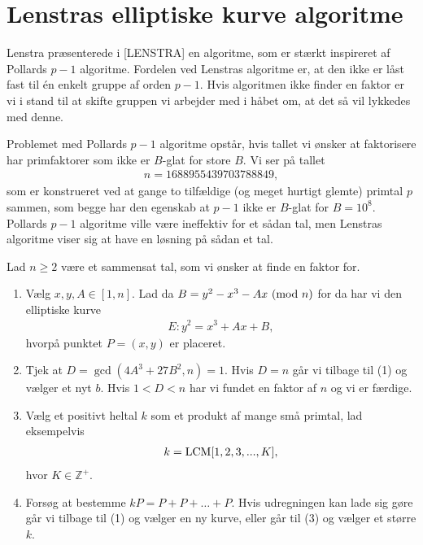 \section{Lenstras elliptiske kurve algoritme}

Lenstra præsenterede i [LENSTRA] en algoritme, som er stærkt inspireret af Pollards $p-1$ algoritme. Fordelen ved Lenstras algoritme er, at den ikke er låst fast til én enkelt gruppe af orden $p-1$. Hvis algoritmen ikke finder en faktor er vi i stand til at skifte gruppen vi arbejder med i håbet om, at det så vil lykkedes med denne.

Problemet med Pollards $p-1$ algoritme opstår, hvis tallet vi ønsker at faktorisere har primfaktorer som ikke er $B$-glat for store $B$. Vi ser på tallet 
\begin{align*}
	n =  1688955439703788849,
\end{align*}
som er konstrueret ved at gange to tilfældige (og meget hurtigt glemte) primtal $p$ sammen, som begge har den egenskab at $p-1$ ikke er $B$-glat for $B=10^8$. Pollards $p-1$ algoritme ville være ineffektiv for et sådan tal, men Lenstras algoritme viser sig at have en løsning på sådan et tal.


\begin{algorithm}
Lad $n \geq 2$ være et sammensat tal, som vi ønsker at finde en faktor for.
\begin{enumerate}
	\item Vælg $x, y, A \in [1, n]$. Lad da $B = y^2 - x^3 - Ax \ (\mathrm{mod} \ n)$ for da har vi den elliptiske kurve
	\begin{align*}
		E : y^2 = x^3 + Ax + B, 
	\end{align*}
	hvorpå punktet $P=(x, y)$ er placeret.
	\item Tjek at $D = \gcd(4A^3 + 27B^2, n) = 1$. Hvis $D=n$ går vi tilbage
	til (1) og vælger et nyt $b$. Hvis $1 < D < n$ har vi fundet en faktor af $n$ og vi er færdige.
	\item Vælg et positivt heltal $k$ som et produkt af mange små primtal, lad eksempelvis
	\begin{align*}
		k = \mathrm{LCM}[1, 2, 3, ..., K],
	\end{align*}
	hvor $K \in \mathbb{Z}^+$.
	\item Forsøg at bestemme $kP = P + P + \ldots + P$. Hvis udregningen kan lade sig gøre går vi tilbage til (1) og 
	vælger en ny kurve, eller går til (3) og vælger et større $k$.
\end{enumerate}
\end{algorithm}

